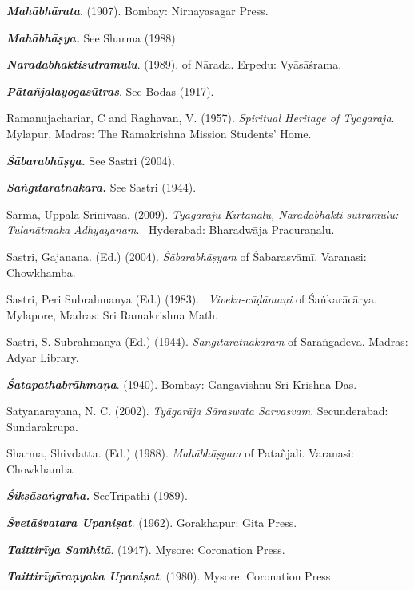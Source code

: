 \begin{thebibliography}{99}
  \textbf{\textit{Mahābhārata}}. (1907). Bombay: Nirnayasagar Press. 

  \textbf{\textit{Mahābhāṣya.}} See Sharma (1988).

  \textbf{\textit{Naradabhaktisūtramulu}}. (1989). of Nārada. Erpedu: Vyāsāśrama.

  \textbf{\textit{Pātañjalayogasūtras}}. See Bodas (1917).

  Ramanujachariar, C and Raghavan, V. (1957). \textit{Spiritual Heritage of Tyagaraja}. Mylapur, Madras: The Ramakrishna Mission Students’ Home.

  \textbf{\textit{Śābarabhāṣya.}} See Sastri (2004).

  \textbf{\textit{Saṅgītaratnākara.}} See Sastri (1944).

  Sarma, Uppala Srinivasa. (2009). \textit{Tyāgarāju Kīrtanalu, Nāradabhakti sūtramulu: Tulanātmaka Adhyayanam}.  Hyderabad: Bharadwāja Pracuraṇalu.

  Sastri, Gajanana. (Ed.) (2004). \textit{Śābarabhāṣyam} of Śabarasvāmī. Varanasi: Chowkhamba.

  Sastri, Peri Subrahmanya (Ed.) (1983).  \textit{Viveka-cūḍāmaṇi} of Śaṅkarācārya. Mylapore, Madras: Sri Ramakrishna Math.

  Sastri, S. Subrahmanya (Ed.) (1944). \textit{Saṅgītaratnākaram} of Sāraṅgadeva. Madras: Adyar Library. 

  \textbf{\textit{Śatapathabrāhmaṇa}}. (1940). Bombay: Gangavishnu Sri Krishna Das.

  Satyanarayana, N. C. (2002). \textit{Tyāgarāja Sāraswata Sarvasvam}. Secunderabad: Sundarakrupa. 

  Sharma, Shivdatta. (Ed.) (1988). \textit{Mahābhāṣyam} of Patañjali. Varanasi: Chowkhamba.

  \textbf{\textit{Śikṣāsaṅgraha.}} SeeTripathi (1989).

  \textbf{\textit{Śvetāśvatara Upaniṣat}}. (1962). Gorakhapur: Gita Press.

  \textbf{\textit{Taittirīya Saṁhitā}}. (1947). Mysore: Coronation Press.

  \textbf{\textit{Taittirīyāraṇyaka Upaniṣat}}. (1980). Mysore: Coronation Press. 


\end{thebibliography}
